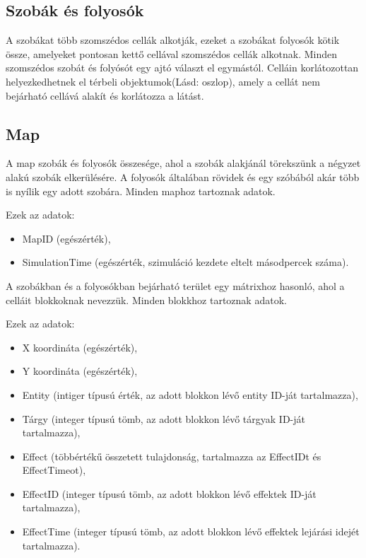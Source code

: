 \subsection{Szobák és folyosók}

A szobákat több szomszédos cellák alkotják, ezeket a szobákat folyosók kötik össze, amelyeket pontosan kettő cellával szomszédos cellák alkotnak.
Minden szomszédos szobát és folyósót egy ajtó választ el egymástól.
Celláin korlátozottan helyezkedhetnek el térbeli objektumok(Lásd: oszlop), amely a cellát nem bejárható cellává alakít és korlátozza a látást.

\subsection{Map}

A map szobák és folyosók összesége, ahol a szobák alakjánál törekszünk a négyzet alakú szobák elkerülésére. A folyosók általában rövidek és egy szóbából akár több is nyílik egy adott szobára.
Minden maphoz tartoznak adatok.

\noindent Ezek az adatok:

\begin{itemize}
    \item MapID (egészérték),
    \item SimulationTime (egészérték, szimuláció kezdete eltelt másodpercek száma).
\end{itemize}

A szobákban és a folyosókban bejárható terület egy mátrixhoz hasonló, ahol a celláit blokkoknak nevezzük.
Minden blokkhoz tartoznak adatok.

\noindent Ezek az adatok:

\begin{itemize}
    \item X koordináta (egészérték),
    \item Y koordináta (egészérték),
    \item Entity (intiger típusú érték,  az adott blokkon lévő entity ID-ját tartalmazza),
    \item Tárgy (integer típusú tömb, az adott blokkon lévő tárgyak ID-ját tartalmazza),
    \item Effect (többértékű összetett tulajdonság, tartalmazza az EffectIDt és EffectTimeot),
    \item EffectID (integer típusú tömb, az adott blokkon lévő effektek ID-ját tartalmazza),
    \item EffectTime (integer típusú tömb, az adott blokkon lévő effektek lejárási idejét tartalmazza).
\end{itemize}

